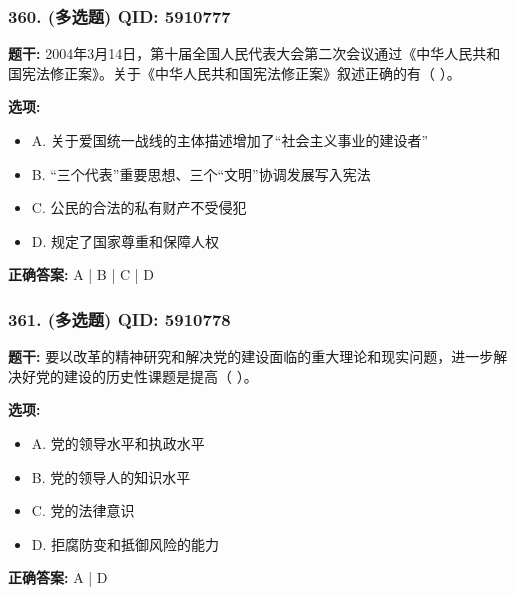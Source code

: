 \documentclass[12pt,UTF8]{ctexart}
\begin{document}
\subsubsection*{360. (多选题) \small QID: 5910777}

\textbf{题干:}
2004年3月14日，第十届全国人民代表大会第二次会议通过《中华人民共和国宪法修正案》。关于《中华人民共和国宪法修正案》叙述正确的有（ ）。

\textbf{选项:}
\begin{itemize}[leftmargin=*]

  \item A. 关于爱国统一战线的主体描述增加了“社会主义事业的建设者”

  \item B. “三个代表”重要思想、三个“文明”协调发展写入宪法

  \item C. 公民的合法的私有财产不受侵犯

  \item D. 规定了国家尊重和保障人权

\end{itemize}

\textbf{正确答案:}
A | B | C | D

\vspace{0.3em}\hrulefill\vspace{0.7em}

\subsubsection*{361. (多选题) \small QID: 5910778}

\textbf{题干:}
要以改革的精神研究和解决党的建设面临的重大理论和现实问题，进一步解决好党的建设的历史性课题是提高（ ）。

\textbf{选项:}
\begin{itemize}[leftmargin=*]

  \item A. 党的领导水平和执政水平

  \item B. 党的领导人的知识水平

  \item C. 党的法律意识

  \item D. 拒腐防变和抵御风险的能力

\end{itemize}

\textbf{正确答案:}
A | D

\vspace{0.3em}\hrulefill\vspace{0.7em}
\end{document}

